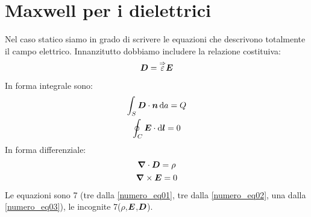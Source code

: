 \section{Maxwell per i dielettrici}
Nel caso statico siamo in grado di scrivere le equazioni che descrivono totalmente il campo elettrico. Innanzitutto dobbiamo includere la relazione costituiva:
\begin{equation}
  \boldsymbol{D}=\overset{\Rightarrow}{\varepsilon}\boldsymbol{E}
  \label{numero_eq01}
\end{equation}
In forma integrale sono:
\begin{gather}
  \int_S\boldsymbol{D}\cdot\boldsymbol{n}\,\mathrm{d} a=Q\\
  \oint_C\boldsymbol{E}\cdot\mathrm{d}\boldsymbol{l}=0
\end{gather}
In forma differenziale:
\begin{gather}
  \label{numero_eq03}
  \boldsymbol{\nabla}\cdot\boldsymbol{D}=\rho\\
  \label{numero_eq02}
  \boldsymbol{\nabla}\times\boldsymbol{E}=0
\end{gather}
Le equazioni sono 7 (tre dalla \eqref{numero_eq01}, tre dalla \eqref{numero_eq02}, una dalla \eqref{numero_eq03}), le incognite 7($\rho$,$\boldsymbol{E}$,$\boldsymbol{D}$).

